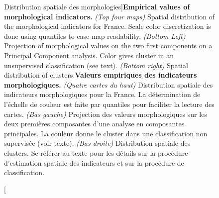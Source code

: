 \begin{figure}
\caption[Empirical values of morphological indicators][Distribution spatiale des morphologies]{\textbf{Empirical values of morphological indicators.} \textit{(Top four maps)} Spatial distribution of the morphological indicators for France. Scale color discretization is done using quantiles to ease map readability. \textit{(Bottom Left)} Projection of morphological values on the two first components on a Principal Component analysis. Color gives cluster in an unsupervised classification (see text). \textit{(Bottom right)} Spatial distribution of clusters.\label{fig:staticcorrelations:empirical}}{\textbf{Valeurs empiriques des indicateurs morphologiques.} \textit{(Quatre cartes du haut)} Distribution spatiale des indicateurs morphologiques pour la France. La détermination de l'échelle de couleur est faite par quantiles pour faciliter la lecture des cartes. \textit{(Bas gauche)} Projection des valeurs morphologiques sur les deux premières composantes d'une analyse en composantes principales. La couleur donne le cluster dans une classification non supervisée (voir texte). \textit{(Bas droite)} Distribution spatiale des clusters. Se référer au texte pour les détails sur la procédure d'estimation spatiale des indicateurs et sur la procédure de classification.\label{fig:staticcorrelations:empirical}}
\end{figure}




